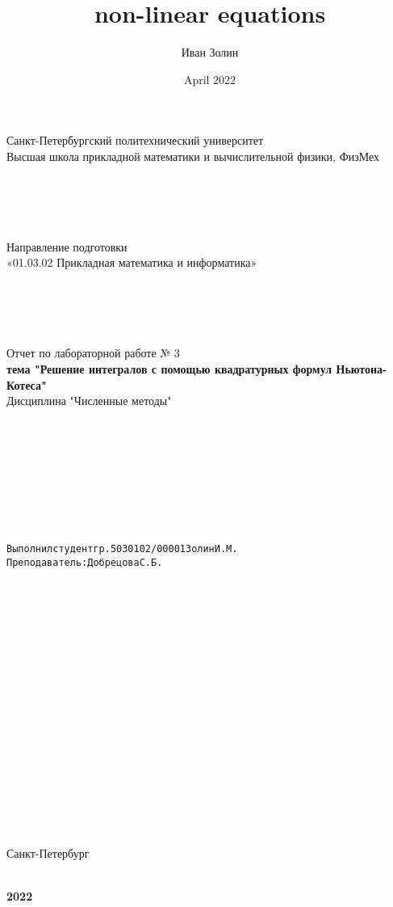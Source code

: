 \documentclass{article}
\title{non-linear equations}
\author{Иван Золин}
\date{April 2022}
\begin{document}
	
	\large
	\begin{center}
		
		Санкт-Петербургский политехнический университет\\
		Высшая школа прикладной математики и вычислительной физики, ФизМех
		
		~\\
		~\\
		~\\
		~\\
		Направление подготовки\\
		«01.03.02 Прикладная математика и информатика»
		
		~\\
		~\\
		~\\
		~\\
		Отчет по лабораторной работе № 3\\
		\textbf{тема "Решение интегралов с помощью квадратурных формул Ньютона-Котеса" }	
		~\\	Дисциплина "Численные методы"
	\end{center}
	
	~\\
	~\\
	~\\
	~\\
	~\\
	~\\
	~\\
	\begin{alltt}
		\begin{center}
			Выполнил студент гр. 5030102/00001			  		   		  Золин И.М.
			Преподаватель: 				              	        	Добрецова С.Б.
		\end{center}
		
	\end{alltt}
	
	~\\
	~\\
	~\\
	~\\
	~\\
	~\\
	~\\
	~\\
	~\\
	~\\
	~\\
	~\\
	~\\
	~\\
	~\\
	~\\
	\begin{center}
		Санкт-Петербург
		
		~\\
		\textbf{2022}

	\end{center}{}
	
\end{document}

